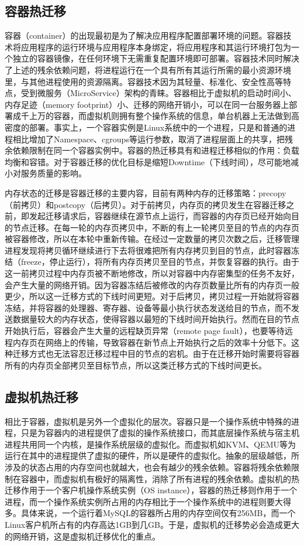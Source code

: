 \subsection{容器热迁移}
\label{chap:containermigration}
容器（container）\cite{container}的出现最初是为了解决应用程序配置部署环境的问题。容器技术将应用程序的运行环境与应用程序本身绑定，将应用程序和其运行环境打包为一个独立的容器镜像，在任何环境下无需重复配置环境即可部署。容器技术同时解决了上述的残余依赖问题，将进程运行在一个具有所有其运行所需的最小资源环境里，与其他进程使用的资源隔离。容器技术因为其轻量、标准化、安全性高等特点，受到微服务（MicroService）架构的青睐。容器相比于虚拟机的启动时间小、内存足迹（memory footprint）小、迁移的网络开销小，可以在同一台服务器上部署成千上万的容器，而虚拟机则拥有整个操作系统的信息，单台机器上无法做到高密度的部署。事实上，一个容器实例是Linux系统中的一个进程，只是和普通的进程相比增加了Namespace、cgroups等运行参数，取消了进程层面上的共享，把残余依赖限制在同一个容器实例中。容器的热迁移\cite{Voyager}具有和进程迁移相似的作用：负载均衡和容错。对于容器迁移的优化目标是缩短Downtime（下线时间），尽可能地减小对服务质量的影响。

内存状态的迁移是容器迁移的主要内容，目前有两种内存的迁移策略：precopy（前拷贝）和postcopy（后拷贝）。对于前拷贝，内存页的拷贝发生在容器迁移之前，即发起迁移请求后，容器继续在源节点上运行，而容器的内存页已经开始向目的节点迁移。在每一轮的内存页拷贝中，不断的有上一轮拷贝至目的节点的内存页被容器修改，所以在本轮中重新传输。在经过一定数量的拷贝次数之后，迁移管理进程发现将拷贝循环继续进行下去将很难把所有内存拷贝到目的节点，此时容器冻结（freeze，停止运行），将所有内存页拷贝至目的节点，并恢复容器的执行。由于这一前拷贝过程中内存页被不断地修改，所以对容器中内存密集型的任务不友好，会产生大量的网络开销。因为容器冻结后被修改的内存页数量比所有的内存页一般更少，所以这一迁移方式的下线时间更短。对于后拷贝，拷贝过程一开始就将容器冻结，并将容器的处理器、寄存器、设备等最小执行状态发送给目的节点，而不发送数据量较大的内存状态，使得容器以最短的下线时间开始执行。然而在目的节点开始执行后，容器会产生大量的远程缺页异常（remote page fault），也要等待远程内存页在网络上的传输，导致容器在新节点上开始执行之后的效率十分低下。这种迁移方式也无法容忍迁移过程中目的节点的宕机。由于在迁移开始时需要将容器所有的内存页全部拷贝至目标节点，所以这类迁移方式的下线时间更长。

\subsection{虚拟机热迁移}
相比于容器，虚拟机是另外一个虚拟化的层次。容器只是一个操作系统中特殊的进程，只是为容器内的进程提供了虚拟的操作系统接口，而其底层操作系统与宿主机进程共用同一个内核，是操作系统层级的虚拟化。而虚拟机如KVM、QEMU等为运行在其中的进程提供了虚拟的硬件，所以是硬件的虚拟化。抽象的层级越低，所涉及的状态占用的内存空间也就越大，也会有越少的残余依赖。容器将残余依赖限制在容器中，而虚拟机有极好的隔离性，消除了所有进程的残余依赖。虚拟机的热迁移作用于一个客户机操作系统实例（OS instance），容器的热迁移则作用于一个进程，而一个操作系统实例所占用的内存相比于一个操作系统中的进程则要大得多。具体来说，一个运行着MySQL的容器所占用的内存空间仅有256MB\cite{Voyager}，而一个Linux客户机所占有的内存高达1GB到几GB。于是，虚拟机的迁移势必会造成更大的网络开销，这是虚拟机迁移优化的重点。

